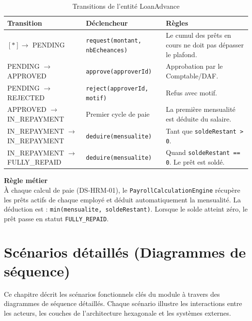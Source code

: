 \documentclass[a4paper,12pt,openany]{book}
\newenvironment{reglemetier}[1][]{%
    \begin{rolebox}%
    \textbf{\color{NavyDark}Règle métier\ifthenelse{\equal{#1}{}}{}{~— #1}}\\[4pt]%
}{%
    \end{rolebox}%
}
\begin{document}
    \begin{table}[H]
        \centering
        \caption{Transitions de l'entité LoanAdvance}
        \label{tab:sm-loan}
        \begin{tabularx}{\textwidth}{llX}
    \toprule
    \textbf{Transition} & \textbf{Déclencheur} & \textbf{Règles} \\
    \midrule
    $[\ast] \rightarrow$ PENDING           & \texttt{request(montant, nbEcheances)} & Le cumul des prêts en cours ne doit pas dépasser le plafond. \\
    PENDING $\rightarrow$ APPROVED         & \texttt{approve(approverId)}     & Approbation par le Comptable/DAF. \\
    PENDING $\rightarrow$ REJECTED         & \texttt{reject(approverId, motif)} & Refus avec motif. \\
    APPROVED $\rightarrow$ IN\_REPAYMENT   & Premier cycle de paie            & La première mensualité est déduite du salaire. \\
    IN\_REPAYMENT $\rightarrow$ IN\_REPAYMENT & \texttt{deduire(mensualite)}  & Tant que \texttt{soldeRestant > 0}. \\
    IN\_REPAYMENT $\rightarrow$ FULLY\_REPAID & \texttt{deduire(mensualite)} & Quand \texttt{soldeRestant == 0}. Le prêt est soldé. \\
    \bottomrule
        \end{tabularx}
    \end{table}

    \begin{reglemetier}
        À chaque calcul de paie (DS-HRM-01), le \texttt{PayrollCalculationEngine} récupère les prêts actifs de chaque employé et déduit automatiquement la mensualité. La déduction est : \texttt{min(mensualite, soldeRestant)}. Lorsque le solde atteint zéro, le prêt passe en statut \texttt{FULLY\_REPAID}.
    \end{reglemetier}


    \chapter{Scénarios détaillés (Diagrammes de séquence)}

    Ce chapitre décrit les scénarios fonctionnels clés du module à travers des diagrammes de séquence détaillés. Chaque scénario illustre les interactions entre les acteurs, les couches de l'architecture hexagonale et les systèmes externes.
\end{document}
